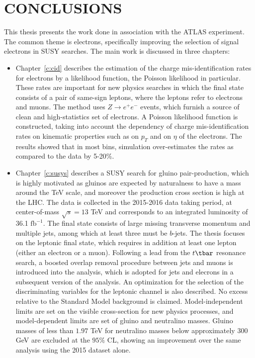 \chapter{CONCLUSIONS}\label{c:con}


This thesis presents the work done in association with the ATLAS experiment.
The common theme is electrons, specifically improving the selection of signal
electrons in SUSY searches. The main work is discussed in three chapters:

\begin{itemize}[label=]

\item Chapter~\ref{c:cid} describes the estimation of the charge
mis-identification rates for electrons by a likelihood function, the Poisson
likelihood in particular. These rates are important for new physics searches in
which the final state consists of a pair of same-sign leptons, where the
leptons refer to electrons and muons. The method uses $Z\to e^+e^-$ events,
which furnish a source of clean and high-statistics set of electrons. A Poisson
likelihood function is constructed, taking into account the dependency of
charge mis-identification rates on kinematic properties such as on $p_T$ and on
$\eta$ of the electrons. The results showed that in most bins, simulation
over-estimates the rates as compared to the data by 5-20$\%$.

\item Chapter~\ref{c:susys} describes a SUSY search for gluino pair-production,
which is highly motivated as gluinos are expected by naturalness to have a mass
around the TeV scale, and moreover the production cross section is high at the
LHC. The data is collected in the 2015-2016 data taking period, at
center-of-mass $\sqrt{s} = 13$ TeV and corresponds to an integrated luminosity
of 36.1 $\text{fb}^{-1}$. The final state consists of large missing transverse
momentum and multiple jets, among which at least three must be $b$-jets. The
thesis focuses on the leptonic final state, which requires in addition at least
one lepton (either an electron or a muon). Following a lead from the $t\tbar$
resonance search, a boosted overlap removal procedure between jets and muons is
introduced into the analysis, which is adopted for jets and elecrons in a
subsequent version of the analysis. An optimization for the selection of the
discriminating variables for the leptonic channel is also described. No excess
relative to the Standard Model background is claimed. Model-independent limits
are set on the visible cross-section for new physics processes, and
model-dependent limits are set of gluino and neutralino masses. Gluino masses
of less than $1.97$ TeV for neutralino masses below approximately $300$ GeV are
excluded at the $95\%$ CL, showing an improvement over the same analysis using
the 2015 dataset alone.



\end{itemize}
